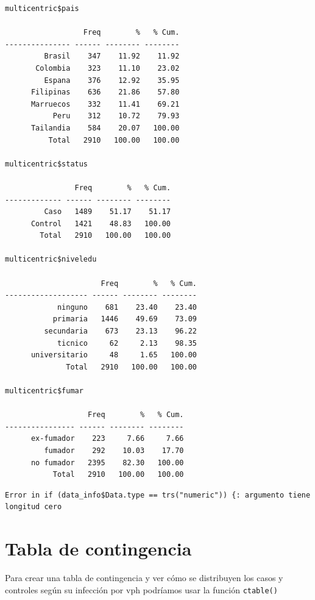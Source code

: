 \documentclass[
]{book}
\newenvironment{Shaded}{\begin{snugshade}}{\end{snugshade}}
\newcommand{\AttributeTok}[1]{\textcolor[rgb]{0.77,0.63,0.00}{#1}}
\newcommand{\FunctionTok}[1]{\textcolor[rgb]{0.00,0.00,0.00}{#1}}
\newcommand{\NormalTok}[1]{#1}
\newcommand{\SpecialCharTok}[1]{\textcolor[rgb]{0.00,0.00,0.00}{#1}}
\newcommand{\StringTok}[1]{\textcolor[rgb]{0.31,0.60,0.02}{#1}}
\begin{document}
\begin{verbatim}
multicentric$pais  

                  Freq        %   % Cum.
--------------- ------ -------- --------
         Brasil    347    11.92    11.92
       Colombia    323    11.10    23.02
         Espana    376    12.92    35.95
      Filipinas    636    21.86    57.80
      Marruecos    332    11.41    69.21
           Peru    312    10.72    79.93
      Tailandia    584    20.07   100.00
          Total   2910   100.00   100.00

multicentric$status  

                Freq        %   % Cum.
------------- ------ -------- --------
         Caso   1489    51.17    51.17
      Control   1421    48.83   100.00
        Total   2910   100.00   100.00

multicentric$niveledu  

                      Freq        %   % Cum.
------------------- ------ -------- --------
            ninguno    681    23.40    23.40
           primaria   1446    49.69    73.09
         secundaria    673    23.13    96.22
            ticnico     62     2.13    98.35
      universitario     48     1.65   100.00
              Total   2910   100.00   100.00

multicentric$fumar  

                   Freq        %   % Cum.
---------------- ------ -------- --------
      ex-fumador    223     7.66     7.66
         fumador    292    10.03    17.70
      no fumador   2395    82.30   100.00
           Total   2910   100.00   100.00
\end{verbatim}

\begin{verbatim}
Error in if (data_info$Data.type == trs("numeric")) {: argumento tiene longitud cero
\end{verbatim}

\hypertarget{tabla-de-contingencia}{%
\section{Tabla de contingencia}\label{tabla-de-contingencia}}

Para crear una tabla de contingencia y ver cómo se distribuyen los casos y controles según su infección por vph podríamos usar la función \texttt{ctable()}

\begin{Shaded}
\end{Shaded}
\end{document}
